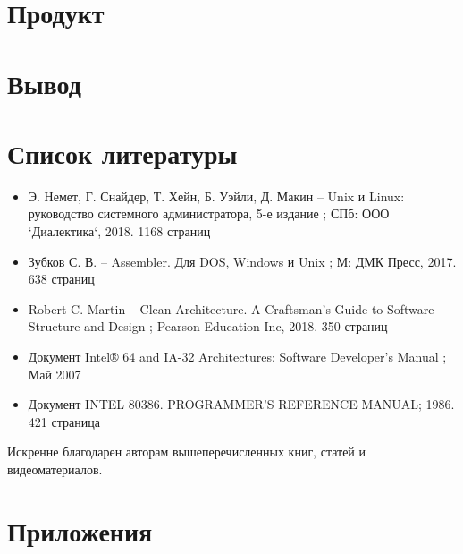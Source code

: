 \documentclass[a4paper]{article}
\begin{document}
\section{Продукт}
\pagebreak
\section{Вывод}
\pagebreak
\section{Список литературы}
	\begin{itemize}
		\item Э. Немет, Г. Снайдер, Т. Хейн, Б. Уэйли, Д. Макин --
			\flqq{}Unix и Linux: руководство системного
			администратора, 5-е издание \frqq{}; СПб: ООО
			`Диалектика`, 2018. 1168 страниц
		\item Зубков С. В. -- \flqq{}Assembler. Для DOS, Windows и
			Unix \frqq{}; М: ДМК Пресс, 2017. 638 страниц
		\item Robert C. Martin -- \flqq{}Clean Architecture. A Craftsman's
			Guide to Software Structure and Design \frqq{}; Pearson
			Education Inc, 2018. 350 страниц
		\item Документ \flqq{}Intel® 64 and IA-32 Architectures:
			Software Developer’s Manual \frqq{}; Май 2007
		\item Документ \flqq{} INTEL 80386. PROGRAMMER'S REFERENCE
		MANUAL\frqq{}; 1986. 421 страница
	\end{itemize}
	Искренне благодарен авторам вышеперечисленных книг, статей и
	видеоматериалов.


\pagebreak
\section{Приложения}
\end{document}
